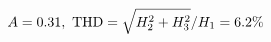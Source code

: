 \documentclass[preview]{standalone}
\begin{document}
\begin{align*}
\special{dvisvgm:raw <g id='unique000'>}A=0.31,\ \text{THD}=\sqrt{H_2^2+H_3^2}/H_1=6.2\%\special{dvisvgm:raw </g>}
\end{align*}
\end{document}
